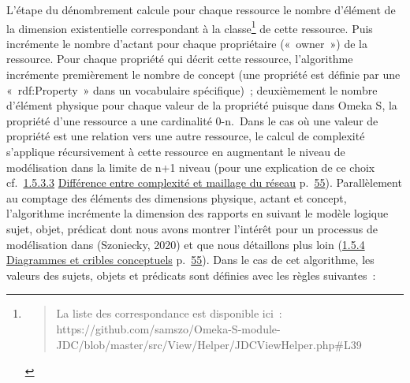 \documentclass[
  letterpaper,
  DIV=11,
  numbers=noendperiod]{scrreprt}
\begin{document}
L'étape du dénombrement calcule pour chaque ressource le nombre
d'élément de la dimension existentielle correspondant à la
classe\footnote{\begin{quote}
  La liste des correspondance est disponible ici~:
  https://github.com/samszo/Omeka-S-module-JDC/blob/master/src/View/Helper/JDCViewHelper.php\#L39
  \end{quote}} de cette ressource. Puis incrémente le nombre d'actant
pour chaque propriétaire («~owner~») de la ressource. Pour chaque
propriété qui décrit cette ressource, l'algorithme incrémente
premièrement le nombre de concept (une propriété est définie par une
«~rdf:Property~» dans un vocabulaire spécifique)~; deuxièmement le
nombre d'élément physique pour chaque valeur de la propriété puisque
dans Omeka S, la propriété d'une ressource a une cardinalité 0-n.~Dans
le cas où une valeur de propriété est une relation vers une autre
ressource, le calcul de complexité s'applique récursivement à cette
ressource en augmentant le niveau de modélisation dans la limite de n+1
niveau (pour une explication de ce choix
cf.~\protect\hyperlink{anchor-65}{1.5.3.3}
\protect\hyperlink{anchor-65}{Différence entre complexité et maillage du
réseau} p.~\protect\hyperlink{anchor-65}{55}). Parallèlement au comptage
des éléments des dimensions physique, actant et concept, l'algorithme
incrémente la dimension des rapports en suivant le modèle logique sujet,
objet, prédicat dont nous avons montrer l'intérêt pour un processus de
modélisation dans (Szoniecky, 2020) et que nous détaillons plus loin
(\protect\hyperlink{anchor-66}{1.5.4}
\protect\hyperlink{anchor-66}{Diagrammes et cribles conceptuels}
p.~\protect\hyperlink{anchor-66}{55}). Dans le cas de cet algorithme,
les valeurs des sujets, objets et prédicats sont définies avec les
règles suivantes~:
\end{document}
